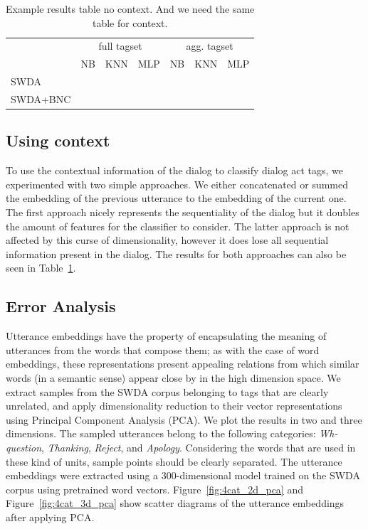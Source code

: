 \begin{table}[]
\centering
\small
\begin{tabular}{llll|lll}
                   & \multicolumn{3}{c|}{full tagset} & \multicolumn{3}{c}{agg. tagset} \\
                   & NB      & KNN     & MLP     & NB     & KNN     & MLP     \\
\hline
SWDA               &         &         &         &        &         &         \\
SWDA+BNC         &         &         &         &        &         &         \\
\end{tabular}
\caption{Example results table no context. And we need the same table for context.}
\label{tab:results}
\end{table}


\subsection{Using context}
To use the contextual information of the dialog to classify dialog act tags, we experimented with two simple approaches. We either concatenated or summed the embedding of the previous utterance to the embedding of the current one.
The first approach nicely represents the sequentiality of the dialog but it doubles the amount of features for the classifier to consider.
The latter approach is not affected by this curse of dimensionality, however it does lose all sequential information present in the dialog.
The results for both approaches can also be seen in Table~\ref{tab:results}. 

\subsection{Error Analysis}
Utterance embeddings have the property of encapsulating the meaning of utterances from the words that compose them; as with the case of word embeddings, these representations present appealing relations from which similar words (in a semantic sense) appear close by in the high dimension space.
We extract samples from the SWDA corpus belonging to tags that are clearly unrelated, and apply dimensionality reduction to their vector representations using Principal Component Analysis (PCA).
We plot the results in two and three dimensions.
The sampled utterances belong to the following categories: \emph{Wh-question}, \emph{Thanking}, \emph{Reject}, and \emph{Apology}.
Considering the words that are used in these kind of units, sample points should be clearly separated.
The utterance embeddings were extracted using a 300-dimensional model trained on the SWDA corpus using pretrained word vectors.
Figure~\ref{fig:4cat_2d_pca} and Figure~\ref{fig:4cat_3d_pca} show scatter diagrams of the utterance embeddings after applying PCA.

